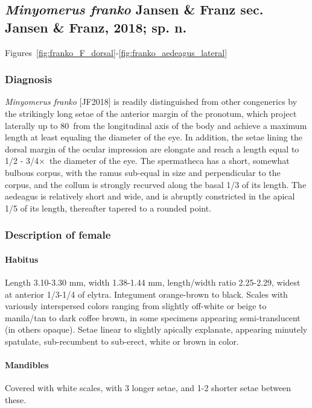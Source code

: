 \documentclass[fleqn,10pt,lineno]{wlpeerj} %
\newcommand{\td}{\textdegree~}
\newcommand{\x}{$\times$~}
\begin{document}
	\subsection*{\textit{Minyomerus franko} Jansen \& Franz sec. Jansen \& Franz, 2018; sp. n.}\label{ssec:franko}
		Figures~\ref{fig:franko_F_dorsal}-\ref{fig:franko_aedeagus_lateral}
		\subsubsection*{Diagnosis}
			\textit{Minyomerus franko} [JF2018] is readily distinguished from other congenerics by the strikingly long setae of the anterior margin of the pronotum, which project laterally up to 80\td from the longitudinal axis of the body and achieve a maximum length at least equaling the diameter of the eye.
			In addition, the setae lining the dorsal margin of the ocular impression are elongate and reach a length equal to 1/2 - 3/4\x the diameter of the eye.
			The spermatheca has a short, somewhat bulbous corpus, with the ramus sub-equal in size and perpendicular to the corpus, and the collum is strongly recurved along the basal 1/3 of its length.
			The aedeagus is relatively short and wide, and is abruptly constricted in the apical 1/5 of its length, thereafter tapered to a rounded point.
		\subsubsection*{Description of female}
			\paragraph{Habitus}
				Length 3.10-3.30 mm, width 1.38-1.44 mm, length/width ratio 2.25-2.29, widest at anterior 1/3-1/4 of elytra.
				Integument orange-brown to black. 
				Scales with variously interspersed colors ranging from slightly off-white or beige to manila/tan to dark coffee brown, in some specimens appearing semi-translucent (in others opaque). 
				Setae linear to slightly apically explanate, appearing minutely spatulate, sub-recumbent to sub-erect, white or brown in color.
			\paragraph{Mandibles}
				Covered with white scales, with 3 longer setae, and 1-2 shorter setae between these.
\end{document}
